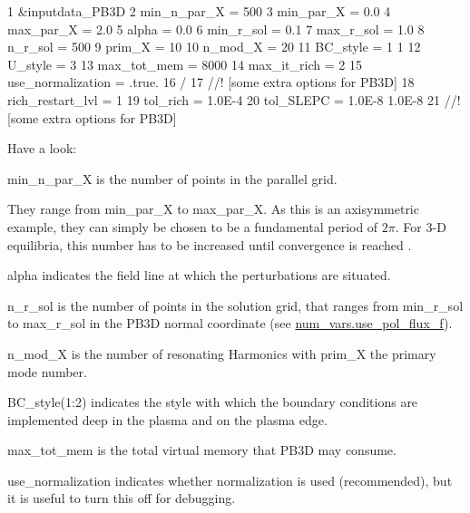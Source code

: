 \begin{DoxyCodeInclude}
1 &inputdata\_PB3D
2     min\_n\_par\_X             = 500
3     min\_par\_X               = 0.0
4     max\_par\_X               = 2.0
5     alpha                   = 0.0
6     min\_r\_sol               = 0.1
7     max\_r\_sol               = 1.0
8     n\_r\_sol                 = 500
9     prim\_X                  = 10
10     n\_mod\_X                 = 20
11     BC\_style                = 1 1
12     U\_style                 = 3
13     max\_tot\_mem             = 8000
14     max\_it\_rich             = 2
15     use\_normalization       = .true.
16 /
17 //! [some extra options for PB3D]
18     rich\_restart\_lvl        = 1
19     tol\_rich                = 1.0E-4
20     tol\_SLEPC               = 1.0E-8 1.0E-8
21 //! [some extra options for PB3D]
\end{DoxyCodeInclude}


Have a look\+:
\begin{DoxyItemize}
\item {\ttfamily min\+\_\+n\+\_\+par\+\_\+X} is the number of points in the parallel grid.
\item They range from {\ttfamily min\+\_\+par\+\_\+X} to {\ttfamily max\+\_\+par\+\_\+X}. As this is an axisymmetric example, they can simply be chosen to be a fundamental period of $ 2\pi $. For 3-\/D equilibria, this number has to be increased until convergence is reached \cite{Weyens2017PB3D}.
\item {\ttfamily alpha} indicates the field line at which the perturbations are situated.
\item {\ttfamily n\+\_\+r\+\_\+sol} is the number of points in the solution grid, that ranges from {\ttfamily min\+\_\+r\+\_\+sol} to {\ttfamily max\+\_\+r\+\_\+sol} in the P\+B3D normal coordinate (see \hyperlink{namespacenum__vars_ae21ec57b791e369c3558c0eb3da1555b}{num\+\_\+vars.\+use\+\_\+pol\+\_\+flux\+\_\+f}).
\item {\ttfamily n\+\_\+mod\+\_\+X} is the number of resonating Harmonics with {\ttfamily prim\+\_\+X} the primary mode number.
\item {\ttfamily B\+C\+\_\+style(1\+:2)} indicates the style with which the boundary conditions are implemented deep in the plasma and on the plasma edge.
\item {\ttfamily max\+\_\+tot\+\_\+mem} is the total virtual memory that P\+B3D may consume.
\item {\ttfamily use\+\_\+normalization} indicates whether normalization is used (recommended), but it is useful to turn this off for debugging.
\end{DoxyItemize}

